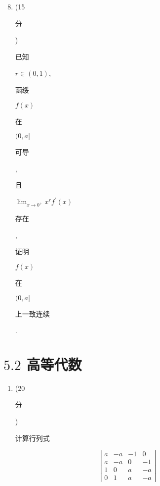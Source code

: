 \documentclass[10pt]{article}
\begin{document}
\begin{enumerate}
  \setcounter{enumi}{7}
  \item (15 \begin{CJK}{UTF8}{mj}分\end{CJK}) \begin{CJK}{UTF8}{mj}已知\end{CJK} $r \in(0,1)$, \begin{CJK}{UTF8}{mj}函绥\end{CJK} $f(x)$ \begin{CJK}{UTF8}{mj}在\end{CJK} $(0, a]$ \begin{CJK}{UTF8}{mj}可导\end{CJK}, \begin{CJK}{UTF8}{mj}且\end{CJK} $\lim _{x \rightarrow 0^{+}} x^{r} f^{\prime}(x)$ \begin{CJK}{UTF8}{mj}存在\end{CJK}, \begin{CJK}{UTF8}{mj}证明\end{CJK} $f(x)$ \begin{CJK}{UTF8}{mj}在\end{CJK} $(0, a]$ \begin{CJK}{UTF8}{mj}上一致连续\end{CJK}.
\end{enumerate}
\section{$5.2$ 高等代数}
\begin{enumerate}
  \item (20 \begin{CJK}{UTF8}{mj}分\end{CJK}) \begin{CJK}{UTF8}{mj}计算行列式\end{CJK}
\end{enumerate}
$$
\left|\begin{array}{cccc}
a & -a & -1 & 0 \\
a & -a & 0 & -1 \\
1 & 0 & a & -a \\
0 & 1 & a & -a
\end{array}\right|
$$
\end{document}

